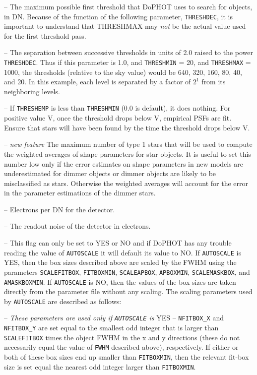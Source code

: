  -- The maximum possible first threshold that
DoPHOT  uses to search for objects, in DN.  
Because of the function of 
the following parameter, {\tt THRESHDEC}, it is important to 
understand that THRESHMAX may {\it not} be the actual value used
for the first threshold pass.

 -- The separation between successive
thresholds in units of 2.0 raised to the power {\tt THRESHDEC}.  Thus if this
parameter is 1.0, and {\tt THRESHMIN} = 20, and {\tt THRESHMAX} = 
1000, the thresholds (relative to the sky value) would be
640, 320, 160, 80, 40, and 20.  In this example, each level is separated by
a factor of $2^1$ from its neighboring levels.

 -- If {\tt THRESHEMP} is less than {\tt THRESHMIN} 
(0.0 is default), it does nothing. For positive 
value V, once the threshold drops below V, empirical PSFs are fit. Ensure
that stars will have been found by the time the threshold drops below V.

 -- {\it new feature} The maximum number of type 1 stars that will be used to compute the weighted averages of shape parameters for star objects.  It is useful to set this number low only if the error estimates on shape parameters in new models are underestimated for dimmer objects or dimmer objects are likely to be misclassified as stars.  Otherwise the weighted averages will account for the error in the parameter estimations of the dimmer stars.

 -- Electrons per DN for the 
detector.

 -- The readout noise of the detector in
electrons.

 -- This flag can only be set to 
YES or NO and if DoPHOT has any trouble reading the value of
{\tt AUTOSCALE} it will default its value to NO.  
If {\tt AUTOSCALE} is YES, then the box sizes described above are scaled by 
the FWHM using the parameters {\tt SCALEFITBOX}, {\tt FITBOXMIN},
{\tt SCALEAPBOX}, {\tt APBOXMIN}, {\tt SCALEMASKBOX},  and
{\tt AMASKBOXMIN}.  If {\tt AUTOSCALE} is NO, then the values
of the box sizes are taken directly from the parameter file 
without any scaling.
The scaling parameters used by {\tt AUTOSCALE} are described 
as follows:

 -- 
{\it These parameters are used
only if {\tt AUTOSCALE} is} YES -- 
{\tt NFITBOX\_X} and 
{\tt NFITBOX\_Y} are set equal to the smallest odd integer
that is larger than 
{\tt SCALEFITBOX} times the object FWHM in the x and y
directions (these do not necessarily equal the value
of {\tt FWHM} described above), respectively.  If either or
both of these 
box sizes end up smaller than {\tt FITBOXMIN},
then the relevant fit-box size is set equal the nearest
odd integer larger than {\tt FITBOXMIN}.

